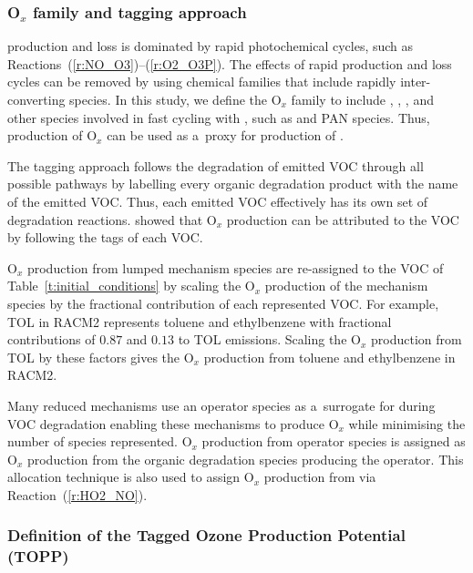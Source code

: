 \documentclass[acpd, online, hvmath]{copernicus}
\begin{document}
\subsubsection{O$_{x}$ family and tagging approach}
\label{ss:tagging}

 production and loss is dominated by rapid photochemical
cycles, such as Reactions~(\ref{r:NO_O3})--(\ref{r:O2_O3P}).  The
effects of rapid production and loss cycles can be removed by using
chemical families that include rapidly inter-converting species.  In
this study, we define the O$_{x}$ family to include ,
, ,  and other species involved
in fast cycling with , such as  and PAN
species.  Thus, production of O$_{x}$ can be used as a~proxy for
production of .

The tagging approach follows the degradation of emitted VOC through
all possible pathways by labelling every organic degradation product
with the name of the emitted VOC.  Thus, each emitted VOC effectively
has its own set of degradation reactions.  \citet{Butler:2011} showed
that O$_{x}$ production can be attributed to the VOC by following
the tags of each VOC.

O$_{x}$ production from lumped mechanism species are re-assigned to
the VOC of Table~\ref{t:initial_conditions} by scaling the O$_{x}$
production of the mechanism species by the fractional contribution of
each represented VOC.  For example, TOL in RACM2 represents toluene
and ethylbenzene with fractional contributions of $0.87$ and $0.13$ to
TOL emissions.  Scaling the O$_{x}$ production from TOL by these
factors gives the O$_{x}$ production from toluene and ethylbenzene
in RACM2.

Many reduced mechanisms use an operator species as a~surrogate for
 during VOC degradation enabling these mechanisms to
produce O$_{x}$ while minimising the number of  species
represented.  O$_{x}$ production from operator species is assigned
as O$_{x}$ production from the organic degradation species
producing the operator.  This allocation technique is also used to
assign O$_{x}$ production from  via
Reaction~(\ref{r:HO2_NO}).

\subsubsection{Definition of the Tagged Ozone Production Potential
  (TOPP)}
\label{sss:TOPP}
\end{document}
